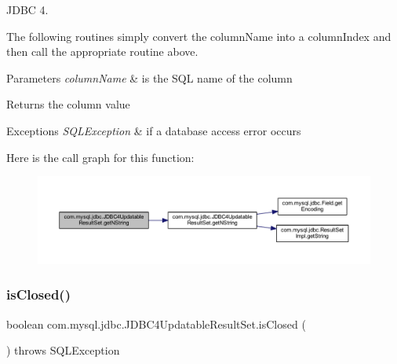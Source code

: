 J\+D\+BC 4.

The following routines simply convert the column\+Name into a column\+Index and then call the appropriate routine above.


\begin{DoxyParams}{Parameters}
{\em column\+Name} & is the S\+QL name of the column\\
\hline
\end{DoxyParams}
\begin{DoxyReturn}{Returns}
the column value
\end{DoxyReturn}

\begin{DoxyExceptions}{Exceptions}
{\em S\+Q\+L\+Exception} & if a database access error occurs \\
\hline
\end{DoxyExceptions}
Here is the call graph for this function\+:
\nopagebreak
\begin{figure}[H]
\begin{center}
\leavevmode
\includegraphics[width=350pt]{classcom_1_1mysql_1_1jdbc_1_1_j_d_b_c4_updatable_result_set_af34b33244f25a186c3117ba260cb8fc4_cgraph}
\end{center}
\end{figure}
\mbox{\label{classcom_1_1mysql_1_1jdbc_1_1_j_d_b_c4_updatable_result_set_a401f43b6faaf6b96e768afa1b3a4e87e}} 
\subsubsection{\texorpdfstring{is\+Closed()}{isClosed()}}
{\footnotesize\ttfamily boolean com.\+mysql.\+jdbc.\+J\+D\+B\+C4\+Updatable\+Result\+Set.\+is\+Closed (\begin{DoxyParamCaption}{ }\end{DoxyParamCaption}) throws S\+Q\+L\+Exception}

